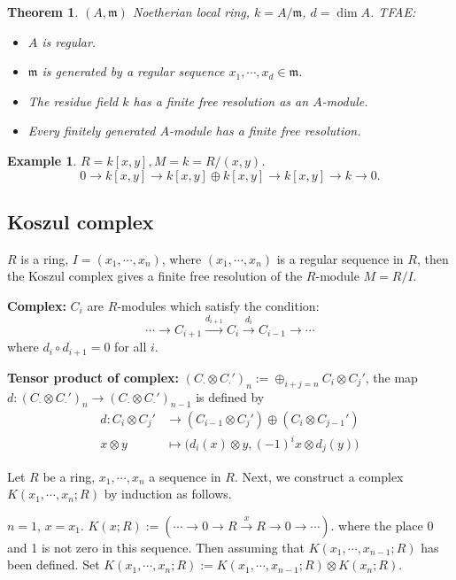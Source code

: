 \documentclass[cs4size]{article}
\newcommand{\frm}{\mathfrak{m}}
\newcommand{\ra}{\rightarrow}
\newcommand{\xr}{\xrightarrow}
\newtheorem{thm}{Theorem}
\newtheorem{ex}{Example}
\begin{document}
\begin{thm}
$(A,\frm)$ Noetherian local ring, $k=A/\frm$, $d=\dim A$. TFAE:
\begin{itemize}
\item $A$ is regular.
\item $\frm$ is generated by a regular sequence $x_1,\cdots,x_d\in\frm$.
\item The residue field $k$ has a finite free resolution as an $A$-module.
\item Every finitely generated $A$-module has a finite free resolution.
\end{itemize}
\end{thm}

\begin{ex}
$R=k[x,y],M=k=R/(x,y)$.
\[0\ra k[x,y]\ra k[x,y]\oplus k[x,y]\ra k[x,y]\ra k\ra 0.\]
\end{ex}

\subsection{Koszul complex}
$R$ is a ring, $I=(x_1,\cdots,x_n)$, where $(x_1,\cdots,x_n)$ is a regular sequence in $R$, then the Koszul complex gives a finite free resolution of the $R$-module $M=R/I$.

\textbf{Complex:} $C_i$ are $R$-modules which satisfy the condition:
\[\cdots\ra C_{i+1}\xr{d_{i+1}} C_i\xr{d_i} C_{i-1}\ra\cdots\]
where $d_i\circ d_{i+1}=0$ for all $i$.

\textbf{Tensor product of complex:} $(C_{\cdot}\otimes C_{\cdot}')_n:=\oplus_{i+j=n}C_i\otimes C_j'$, the map $d: (C_{\cdot}\otimes C_{\cdot}')_n\ra (C_{\cdot}\otimes C_{\cdot}')_{n-1}$ is defined by
\begin{align*}
d: C_i\otimes C_j'& \ra (C_{i-1}\otimes C_j')\oplus(C_i\otimes C_{j-1}')\\
x\otimes y&\mapsto \big(d_i(x)\otimes y,(-1)^ix\otimes d_j(y)\big)
\end{align*}

Let $R$ be a ring, $x_1,\cdots, x_n$ a sequence in $R$. Next, we construct a complex $K(x_1,\cdots,x_n;R)$ by induction as follows.

$n=1$, $x=x_1$. $K(x;R):=(\cdots\ra 0\ra R\xr{x}R\ra 0\ra\cdots).$ where the place 0 and 1 is not zero in this sequence. Then assuming that $K(x_1,\cdots,x_{n-1};R)$ has been defined. Set $K(x_1,\cdots,x_n;R):=K(x_1,\cdots,x_{n-1};R)\otimes K(x_n;R)$.
\end{document}
